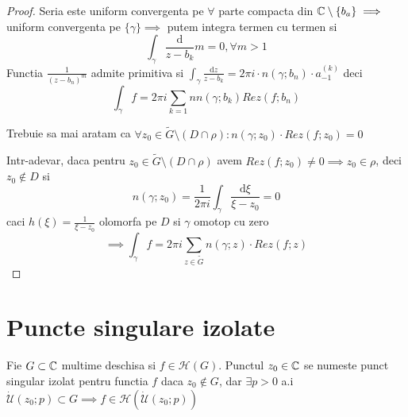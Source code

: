\begin{theorem}
\begin{proof}
        Seria este uniform convergenta pe $\forall$ parte compacta din
				$\mathbb{C} \setminus \{b_a \} \implies$ uniform convergenta pe
				$\{ \gamma \} \implies$ putem integra termen cu termen si
        \[
            \int_{\gamma} \frac{\mathrm{d}}{z-b_k} m = 0 , \forall m>1
        \]
        Functia $\displaystyle \frac{1}{(z-b_n)^m}$ admite primitiva si
        $\displaystyle
            \int_{\gamma} \frac{\mathrm{d}z} {z - b_k} = 2 \pi i \cdot n(\gamma;b_n) \cdot a_{-1}^{(k)}
        $ deci
        \[
					\int_{\gamma} f = 2 \pi i \sum_{k=1}{n} n(\gamma; b_k) Rez(f;b_n)
        \]

				Trebuie sa mai aratam ca
				$\forall z_0 \in \widetilde{G} \setminus(D \cap \rho) \colon n(\gamma; z_0)\cdot Rez(f;z_0) = 0$

        Intr-adevar, daca pentru
				$z_0\in \widetilde{G} \setminus (D\cap\rho)$ avem
				$Rez(f;z_0) \neq 0 \implies z_0 \in \rho $, deci $z_0\notin D$ si
        \[
            n(\gamma;z_0) = \frac{1}{2 \pi i} \int_{\gamma}
            \frac{\mathrm{d} \xi}{\xi - z_0} = 0
        \]
        caci $h(\xi) = \frac{1}{\xi - z_0}$ olomorfa pe $D$ si $\gamma$ omotop cu zero
        \[
            \implies \int_{\gamma} f = 2 \pi i \sum_{z\in \widetilde{G}} n(\gamma;z) \cdot Rez(f;z)
        \]

    \end{proof}
\end{theorem}

\section{Puncte singulare izolate}

\begin{definition}
    Fie $G\subset \mathbb{C}$ multime deschisa si $f\in\mathcal{H}(G)$. Punctul $z_0 \in \mathbb{C}$ se numeste punct singular izolat pentru functia $f$ daca $z_0 \notin G$, dar
    $\exists p>0$ a.i
    $\mathcal{\dot{U}}(z_0;p)\subset G \implies f \in \mathcal{H}(\mathcal{\dot{U}}(z_0;p))$
\end{definition}